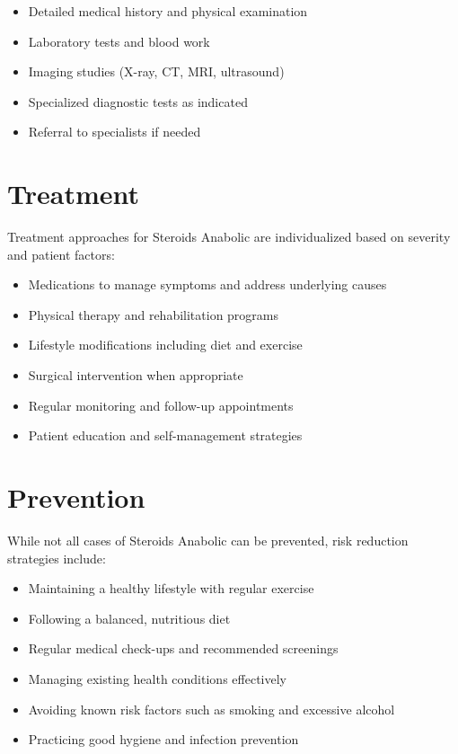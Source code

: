 \begin{itemize}
\item Detailed medical history and physical examination
\item Laboratory tests and blood work
\item Imaging studies (X-ray, CT, MRI, ultrasound)
\item Specialized diagnostic tests as indicated
\item Referral to specialists if needed
\end{itemize}

\section*{Treatment}
Treatment approaches for Steroids Anabolic are individualized based on severity and patient factors:

\begin{itemize}
\item Medications to manage symptoms and address underlying causes
\item Physical therapy and rehabilitation programs
\item Lifestyle modifications including diet and exercise
\item Surgical intervention when appropriate
\item Regular monitoring and follow-up appointments
\item Patient education and self-management strategies
\end{itemize}

\section*{Prevention}
While not all cases of Steroids Anabolic can be prevented, risk reduction strategies include:

\begin{itemize}
\item Maintaining a healthy lifestyle with regular exercise
\item Following a balanced, nutritious diet
\item Regular medical check-ups and recommended screenings
\item Managing existing health conditions effectively
\item Avoiding known risk factors such as smoking and excessive alcohol
\item Practicing good hygiene and infection prevention
\end{itemize}


